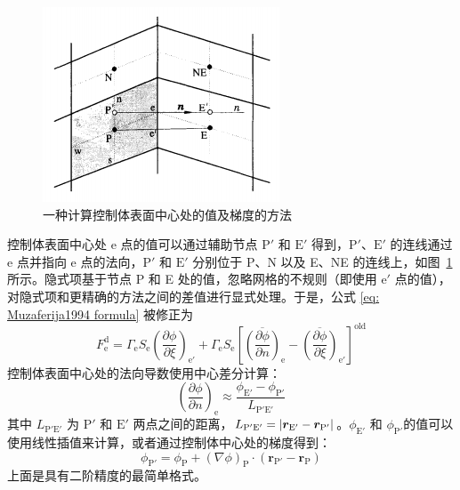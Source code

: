 \begin{figure}
	\centering
	\includegraphics[scale=.8]{figs/alternative-way}
	\caption{一种计算控制体表面中心处的值及梯度的方法 \cite[237]{Ferziger2002}}
	\label{fig: alternative way}
\end{figure}

控制体表面中心处 e 点的值可以通过辅助节点 $\mathrm{P}'$ 和 $\mathrm{E}'$ 得到，$\mathrm{P}'$、$\mathrm{E}'$ 的连线通过 e 点并指向 e 点的法向，$\mathrm{P}'$ 和 $\mathrm{E}'$ 分别位于 P、N 以及 E、NE 的连线上，如图~\ref{fig: alternative way} 所示。隐式项基于节点 P 和 E 处的值，忽略网格的不规则（即使用 $\mathrm{e}'$ 点的值），对隐式项和更精确的方法之间的差值进行显式处理。于是，公式 \eqref{eq: Muzaferija1994 formula} 被修正为
\begin{equation}
	F_{\mathrm{e}}^{\mathrm{d}} = \varGamma_{\mathrm{e}}S_{\mathrm{e}}\left(\frac{\partial\phi}{\partial\xi}\right)_{\mathrm{e'}} +
	\varGamma_{\mathrm{e}}S_{\mathrm{e}}\left[ 
	\overline{\left(\frac{\partial\phi}{\partial n}\right)}_{\mathrm{e}} - 
	\overline{\left(\frac{\partial\phi}{\partial\xi}\right)}_{\mathrm{e'}} \right]^{\mathrm{old}}
\end{equation}
控制体表面中心处的法向导数使用中心差分计算：
\begin{equation}
	\left(\frac{\partial\phi}{\partial n}\right)_{\mathrm{e}} \approx
	\frac{\phi_{\mathrm{E'}}-\phi_{\mathrm{P'}}}{L_{\mathrm{P'E'}}}
\end{equation}
其中 $L_{\mathrm{P'E'}}$ 为 $\mathrm{P}'$ 和 $\mathrm{E}'$ 两点之间的距离，$L_{\mathrm{P'E'}} = \lvert\bm{r}_{\mathrm{E'}}-\bm{r}_{\mathrm{P'}}\vert$。$\phi_{\mathrm{E'}}$ 和 $\phi_{\mathrm{P'}}$的值可以使用线性插值来计算，或者通过控制体中心处的梯度得到：
\begin{equation}
	\phi_{\mathrm{P'}} = \phi_{\mathrm{P}} + (\nabla\phi)_{\mathrm{P}}\cdot(\bm{r}_{\mathrm{P'}}-\bm{r}_{\mathrm{P}})
\end{equation}
上面是具有二阶精度的最简单格式。

